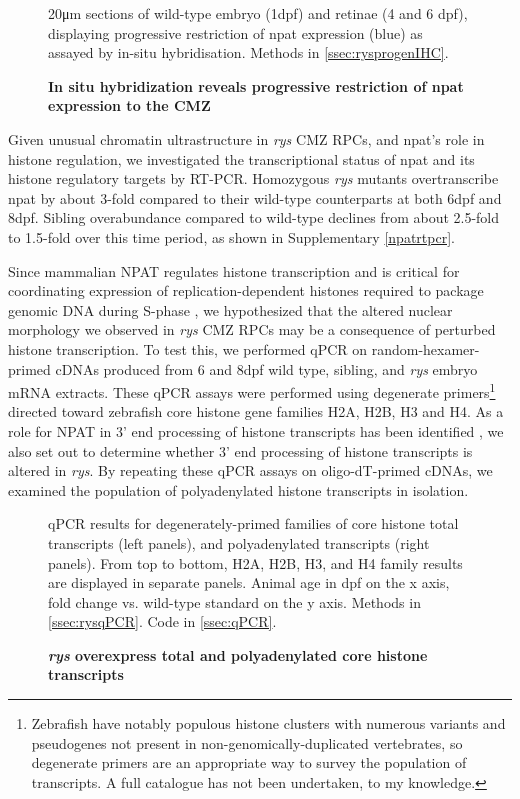 \begin{figure}[!h]
    \caption{{\bf In situ hybridization reveals progressive restriction of npat expression to the CMZ}}
    20\si{\micro\metre} sections of wild-type embryo (1dpf) and retinae (4 and 6 dpf), displaying progressive restriction of npat expression (blue) as assayed by in-situ hybridisation.
    Methods in \autoref{ssec:rysprogenIHC}.
    \label{npatISH}
\end{figure}

Given unusual chromatin ultrastructure in \textit{rys} CMZ RPCs, and npat's role in histone regulation, we investigated the transcriptional status of npat and its histone regulatory targets by RT-PCR. Homozygous \textit{rys} mutants overtranscribe npat by about 3-fold compared to their wild-type counterparts at both 6dpf and 8dpf. Sibling overabundance compared to wild-type declines from about 2.5-fold to 1.5-fold over this time period, as shown in Supplementary \autoref{npatrtpcr}.

Since mammalian NPAT regulates histone transcription and is critical for coordinating expression of replication-dependent histones required to package genomic DNA during S-phase \cite{Zhao2000}, we hypothesized that the altered nuclear morphology we observed in \textit{rys} CMZ RPCs may be a consequence of perturbed histone transcription. To test this, we performed qPCR on random-hexamer-primed cDNAs produced from 6 and 8dpf wild type, sibling, and \textit{rys} embryo mRNA extracts. These qPCR assays were performed using degenerate primers\footnote{Zebrafish have notably populous histone clusters with numerous variants and pseudogenes not present in non-genomically-duplicated vertebrates, so degenerate primers are an appropriate way to survey the population of transcripts. A full catalogue has not been undertaken, to my knowledge.} directed toward zebrafish core histone gene families H2A, H2B, H3 and H4. As a role for NPAT in 3’ end processing of histone transcripts has been identified \cite{Pirngruber2010}, we also set out to determine whether 3’ end processing of histone transcripts is altered in \textit{rys}. By repeating these qPCR assays on oligo-dT-primed cDNAs, we examined the population of polyadenylated histone transcripts in isolation. 

\begin{figure}[!h]
    \caption{{\bf \textit{rys} overexpress total and polyadenylated core histone transcripts}}
    qPCR results for degenerately-primed families of core histone total transcripts (left panels), and polyadenylated transcripts (right panels). From top to bottom, H2A, H2B, H3, and H4 family results are displayed in separate panels. Animal age in dpf on the x axis, fold change vs. wild-type standard on the y axis.    
    \label{histonertpcr}
    Methods in \autoref{ssec:rysqPCR}.
    Code in \autoref{ssec:qPCR}.
\end{figure}

